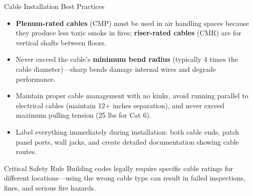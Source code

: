 \documentclass[aspectratio=169]{beamer}
\begin{document}
\begin{frame}{Cable Installation Best Practices}
    \begin{itemize}
        \item \textbf{Plenum-rated cables} (CMP) must be used in air handling spaces because they produce less toxic smoke in fires; \textbf{riser-rated cables} (CMR) are for vertical shafts between floors.
        \item Never exceed the cable's \textbf{minimum bend radius} (typically 4 times the cable diameter)---sharp bends damage internal wires and degrade performance.
        \item Maintain proper cable management with no kinks, avoid running parallel to electrical cables (maintain 12+ inches separation), and never exceed maximum pulling tension (25 lbs for Cat 6).
        \item Label everything immediately during installation: both cable ends, patch panel ports, wall jacks, and create detailed documentation showing cable routes.
    \end{itemize}
    
    \vspace{0.3cm}
    \begin{alertblock}{Critical Safety Rule}
        Building codes legally require specific cable ratings for different locations---using the wrong cable type can result in failed inspections, fines, and serious fire hazards.
    \end{alertblock}
\end{frame}
\end{document}
